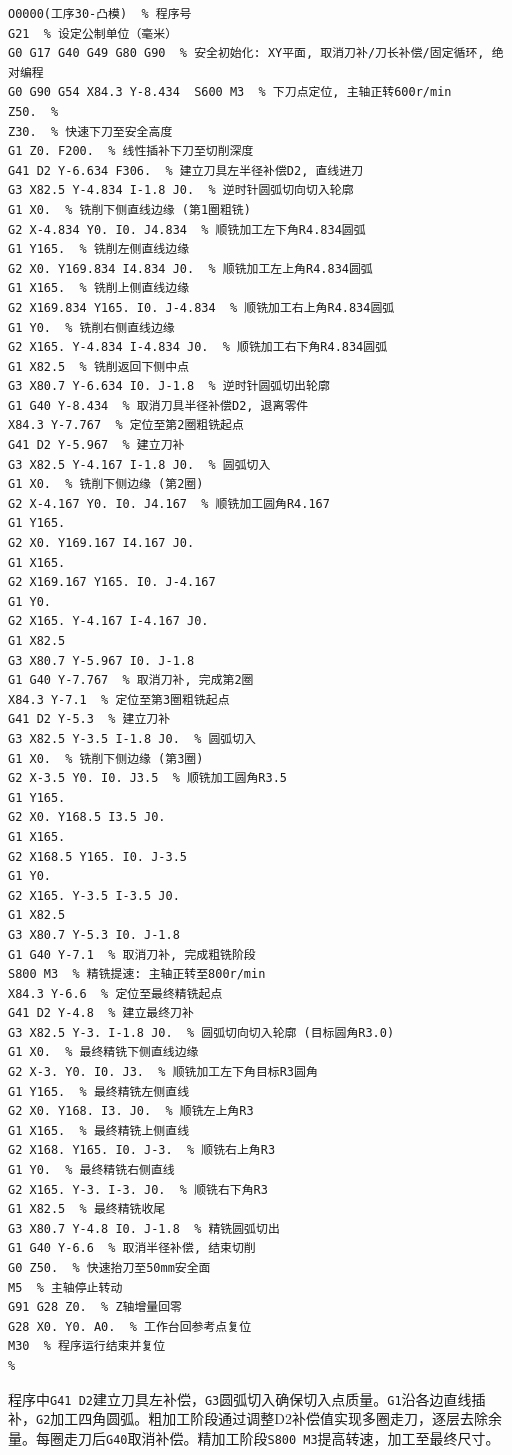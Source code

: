 \documentclass{xautCADreport}
\begin{document}
\begin{lstlisting}[caption={工序30凸模铣侧面程序}]
%
O0000(工序30-凸模)  % 程序号
G21  % 设定公制单位（毫米）
G0 G17 G40 G49 G80 G90  % 安全初始化: XY平面, 取消刀补/刀长补偿/固定循环, 绝对编程
G0 G90 G54 X84.3 Y-8.434  S600 M3  % 下刀点定位, 主轴正转600r/min
Z50.  % 
Z30.  % 快速下刀至安全高度
G1 Z0. F200.  % 线性插补下刀至切削深度
G41 D2 Y-6.634 F306.  % 建立刀具左半径补偿D2, 直线进刀
G3 X82.5 Y-4.834 I-1.8 J0.  % 逆时针圆弧切向切入轮廓
G1 X0.  % 铣削下侧直线边缘 (第1圈粗铣)
G2 X-4.834 Y0. I0. J4.834  % 顺铣加工左下角R4.834圆弧
G1 Y165.  % 铣削左侧直线边缘
G2 X0. Y169.834 I4.834 J0.  % 顺铣加工左上角R4.834圆弧
G1 X165.  % 铣削上侧直线边缘
G2 X169.834 Y165. I0. J-4.834  % 顺铣加工右上角R4.834圆弧
G1 Y0.  % 铣削右侧直线边缘
G2 X165. Y-4.834 I-4.834 J0.  % 顺铣加工右下角R4.834圆弧
G1 X82.5  % 铣削返回下侧中点
G3 X80.7 Y-6.634 I0. J-1.8  % 逆时针圆弧切出轮廓
G1 G40 Y-8.434  % 取消刀具半径补偿D2, 退离零件
X84.3 Y-7.767  % 定位至第2圈粗铣起点
G41 D2 Y-5.967  % 建立刀补
G3 X82.5 Y-4.167 I-1.8 J0.  % 圆弧切入
G1 X0.  % 铣削下侧边缘 (第2圈)
G2 X-4.167 Y0. I0. J4.167  % 顺铣加工圆角R4.167
G1 Y165.
G2 X0. Y169.167 I4.167 J0.
G1 X165.
G2 X169.167 Y165. I0. J-4.167
G1 Y0.
G2 X165. Y-4.167 I-4.167 J0.
G1 X82.5
G3 X80.7 Y-5.967 I0. J-1.8
G1 G40 Y-7.767  % 取消刀补, 完成第2圈
X84.3 Y-7.1  % 定位至第3圈粗铣起点
G41 D2 Y-5.3  % 建立刀补
G3 X82.5 Y-3.5 I-1.8 J0.  % 圆弧切入
G1 X0.  % 铣削下侧边缘 (第3圈)
G2 X-3.5 Y0. I0. J3.5  % 顺铣加工圆角R3.5
G1 Y165.
G2 X0. Y168.5 I3.5 J0.
G1 X165.
G2 X168.5 Y165. I0. J-3.5
G1 Y0.
G2 X165. Y-3.5 I-3.5 J0.
G1 X82.5
G3 X80.7 Y-5.3 I0. J-1.8
G1 G40 Y-7.1  % 取消刀补, 完成粗铣阶段
S800 M3  % 精铣提速: 主轴正转至800r/min
X84.3 Y-6.6  % 定位至最终精铣起点
G41 D2 Y-4.8  % 建立最终刀补
G3 X82.5 Y-3. I-1.8 J0.  % 圆弧切向切入轮廓 (目标圆角R3.0)
G1 X0.  % 最终精铣下侧直线边缘
G2 X-3. Y0. I0. J3.  % 顺铣加工左下角目标R3圆角
G1 Y165.  % 最终精铣左侧直线
G2 X0. Y168. I3. J0.  % 顺铣左上角R3
G1 X165.  % 最终精铣上侧直线
G2 X168. Y165. I0. J-3.  % 顺铣右上角R3
G1 Y0.  % 最终精铣右侧直线
G2 X165. Y-3. I-3. J0.  % 顺铣右下角R3
G1 X82.5  % 最终精铣收尾
G3 X80.7 Y-4.8 I0. J-1.8  % 精铣圆弧切出
G1 G40 Y-6.6  % 取消半径补偿, 结束切削
G0 Z50.  % 快速抬刀至50mm安全面
M5  % 主轴停止转动
G91 G28 Z0.  % Z轴增量回零
G28 X0. Y0. A0.  % 工作台回参考点复位
M30  % 程序运行结束并复位
%
\end{lstlisting}

程序中\texttt{G41 D2}建立刀具左补偿，\texttt{G3}圆弧切入确保切入点质量。\texttt{G1}沿各边直线插补，\texttt{G2}加工四角圆弧。粗加工阶段通过调整D2补偿值实现多圈走刀，逐层去除余量。每圈走刀后\texttt{G40}取消补偿。精加工阶段\texttt{S800 M3}提高转速，加工至最终尺寸。
\end{document}
